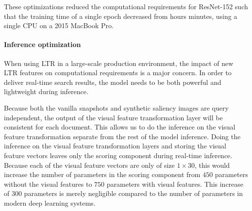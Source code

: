 These optimizations reduced the computational requirements for ResNet-152 such that the training time of a single epoch decreased from hours minutes, using a single CPU on a 2015 MacBook Pro. 

\paragraph{Inference optimization}
When using \ac{LTR} in a large-scale production environment, the impact of new \ac{LTR} features on computational requirements is a major concern. 
In order to deliver real-time search results, the model needs to be both powerful and lightweight during inference. 

Because both the vanilla snapshots and synthetic saliency images are query independent, the output of the visual feature transformation layer will be consistent for each document. This allows us to do the inference on the visual feature transformation separate from the rest of the model inference. Doing the inference on the visual feature transformation layers and storing the visual feature vectors leaves only the scoring component during real-time inference. Because each of the visual feature vectors are only of size $1\times30$, this would increase the number of parameters in the scoring component from $450$ parameters without the visual features to $750$ parameters with visual features. This increase of $300$ parameters is merely negligible compared to the number of parameters in modern deep learning systems. 




